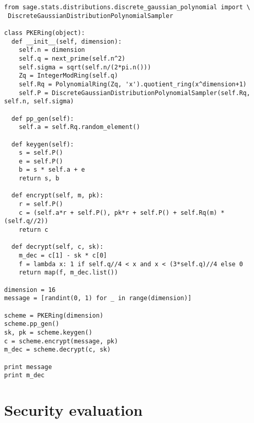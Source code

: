 \documentclass[10pt,a4paper,nobib]{tufte-handout}
\begin{document}
\lstset{language=sage,label= ,caption= ,captionpos=b,numbers=none}
\begin{lstlisting}
from sage.stats.distributions.discrete_gaussian_polynomial import \
 DiscreteGaussianDistributionPolynomialSampler

class PKERing(object):
  def __init__(self, dimension):
    self.n = dimension
    self.q = next_prime(self.n^2)
    self.sigma = sqrt(self.n/(2*pi.n()))
    Zq = IntegerModRing(self.q)
    self.Rq = PolynomialRing(Zq, 'x').quotient_ring(x^dimension+1)
    self.P = DiscreteGaussianDistributionPolynomialSampler(self.Rq, self.n, self.sigma)

  def pp_gen(self):
    self.a = self.Rq.random_element()

  def keygen(self):
    s = self.P()
    e = self.P()
    b = s * self.a + e
    return s, b

  def encrypt(self, m, pk):
    r = self.P()
    c = (self.a*r + self.P(), pk*r + self.P() + self.Rq(m) * (self.q//2))
    return c

  def decrypt(self, c, sk):
    m_dec = c[1] - sk * c[0]
    f = lambda x: 1 if self.q//4 < x and x < (3*self.q)//4 else 0
    return map(f, m_dec.list())

dimension = 16
message = [randint(0, 1) for _ in range(dimension)]

scheme = PKERing(dimension)
scheme.pp_gen()
sk, pk = scheme.keygen()
c = scheme.encrypt(message, pk)
m_dec = scheme.decrypt(c, sk)

print message
print m_dec
\end{lstlisting}

\section{Security evaluation}
\end{document}
